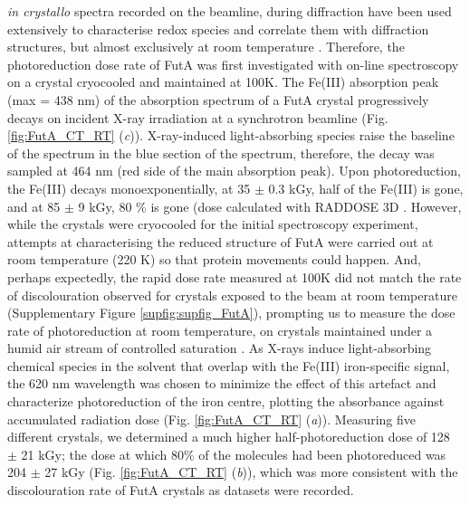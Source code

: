 \textit{in crystallo} spectra recorded on the beamline, during diffraction have been used extensively to characterise redox species and correlate them with diffraction structures, but almost exclusively at room temperature \parencite{berglundCatalyticPathwayHorseradish2002, beitlichCryoradiolyticReductionCrystalline2007,mcgeehanColouringCryocooledCrystals2009, uenoLowdoseXrayStructure2019}. Therefore, the photoreduction dose rate of FutA was first investigated with on-line spectroscopy on a crystal cryocooled and maintained at 100K. The Fe(III) absorption peak (\textlambda max = 438 nm) \parencite{orvilleStructuresCompetitiveInhibitor1997} of the absorption spectrum of a FutA crystal progressively decays on incident X-ray irradiation at a synchrotron beamline (Fig. \ref{fig:FutA_CT_RT} (\textit{c})). X-ray-induced light-absorbing species raise the baseline of the spectrum in the blue section of the spectrum, therefore, the decay was sampled at 464 nm (red side of the main absorption peak). Upon photoreduction, the Fe(III) decays monoexponentially, at 35 \(\pm\) 0.3 kGy, half of the Fe(III) is gone, and at 85 \(\pm\) 9 kGy, 80 \% is gone (dose calculated with RADDOSE 3D \parencite{buryEstimateYourDose2018}. However, while the crystals were cryocooled for the initial spectroscopy experiment, attempts at characterising the reduced structure of FutA were carried out at room temperature (220 K) so that protein movements could happen. And, perhaps expectedly, the rapid dose rate measured at 100K did not match the rate of discolouration observed for crystals exposed to the beam at room temperature (Supplementary Figure \ref{supfig:supfig_FutA}), prompting us to measure the dose rate of photoreduction at room temperature, on crystals maintained under a humid air stream of controlled saturation \parencite{sanchez-weatherbyImprovingDiffractionHumidity2009}. As X-rays induce light-absorbing chemical species in the solvent that overlap with the Fe(III) iron-specific signal, the 620 nm wavelength was chosen to minimize the effect of this artefact and characterize photoreduction of the iron centre, plotting the absorbance against accumulated radiation dose (Fig. \ref{fig:FutA_CT_RT} (\textit{a})). Measuring five different crystals, we determined a much higher half-photoreduction dose of 128 \(\pm\) 21 kGy; the dose at which 80\% of the molecules had been photoreduced was 204 \(\pm\) 27 kGy (Fig. \ref{fig:FutA_CT_RT} (\textit{b})), which was more consistent with the discolouration rate of FutA crystals as datasets were recorded.

